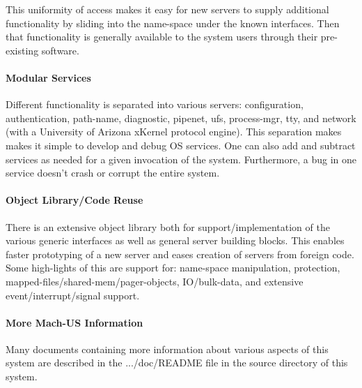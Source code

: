 This uniformity of access makes it easy for new servers to
supply additional functionality by sliding into the name-space under the
known interfaces.  Then
that functionality is generally available to the system users through their
pre-existing software.

\paragraph{Modular Services}
Different functionality is separated into various servers: 
configuration, authentication, path-name, diagnostic,
pipenet, ufs, process-mgr, tty,
and network (with a University of Arizona xKernel protocol engine).
This separation makes makes it simple to develop and debug OS services.
One can also add and subtract
services as needed for a given invocation of the system.  Furthermore,
a bug in one service doesn't crash or corrupt the entire system.

\paragraph{Object Library/Code Reuse}
There is an extensive object library both for support/implementation of
the various generic interfaces as well as general server building blocks.
This enables faster prototyping of a new server and eases creation of
servers from foreign code.  Some high-lights of this are support for:
name-space manipulation, protection,
mapped-files/shared-mem/pager-objects, IO/bulk-data,
and extensive event/interrupt/signal support.

\paragraph{More Mach-US Information}
Many documents containing more information about various aspects of
this system are described in the .../doc/README file in the source directory
of this system.


